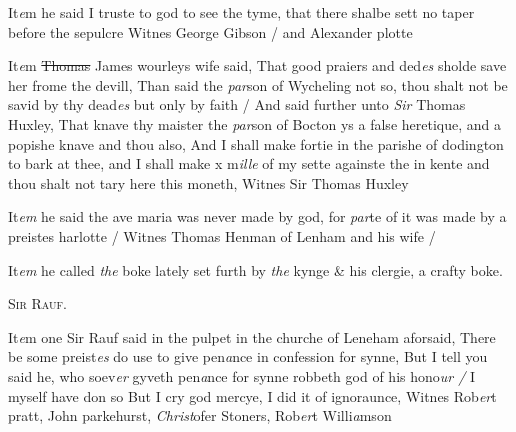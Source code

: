 \documentclass[12pt, a4paper]{book}
\begin{document}
		\ifthenelse{\isodd{\thepage}}
		{\reversemarginpar}
		{\normalmarginpar}
		 It\textit{e}m he said I truste to god to see the tyme, that there shalbe sett no taper
	before the sepulcre Witnes George Gibson / and Alexander plotte

	
	
				\marginpar[\vspace{0.5cm}{\textcolor{Gray}{xxix daye of Maye}}]{}
			
	
				\marginpar[\vspace{0.5cm}{\textcolor{Gray}{seditious}}]{}
			
	
		\ifthenelse{\isodd{\thepage}}
		{\reversemarginpar}
		{\normalmarginpar}
		It\textit{e}m \sout{Thomas} James wourleys wife said, That good praiers and ded\textit{es}
		sholde save her frome the devill, Than said the \textit{par}son of Wycheling
  not so, thou shalt not be savid by thy dead\textit{es} but only by faith /
		And said further unto \textit{Sir} Thomas Huxley, That knave thy maister
 the \textit{par}son of Bocton ys a false heretique, and a popishe knave and
 thou also, And I shall make fortie in the parishe of dodington to bark
 at thee, and I shall make x m\textit{ille} of my sette againste the in kente
 and thou shalt not tary here this moneth, Witnes Sir Thomas
 Huxley

		\ifthenelse{\isodd{\thepage}}
		{\reversemarginpar}
		{\normalmarginpar}
		 It\textit{em} he said the ave maria was never made by god, for \textit{par}te of it was
	made by a preistes harlotte / Witnes Thomas Henman of Lenham
 and his wife /

		\ifthenelse{\isodd{\thepage}}
		{\reversemarginpar}
		{\normalmarginpar}
		 It\textit{em} he called \textit{the} boke lately set furth by \textit{the} kynge \& his clergie,
 a crafty boke.

            
            	
				\begin{center} \begin{large} {\scshape Sir Rauf.} \end{large} \end{center}
			

 	
 		
			
            	
			
 		
		\ifthenelse{\isodd{\thepage}}
		{\reversemarginpar}
		{\normalmarginpar}
		It\textit{e}m one Sir Rauf said in the pulpet in the churche of
 Leneham aforsaid, There be some preist\textit{es} do use to give pen\textit{a}nce in
  confession for synne, But I tell you said he, who soev\textit{er} gyveth
 pen\textit{a}nce for synne robbeth god of his hono\textit{ur /} I myself have don so
 			But I cry god mercye, I did it of ignoraunce, Witnes Rob\textit{er}t
 				pratt, John parkehurst, \textit{Christ}ofer Stoners, Rob\textit{er}t Willi\textit{a}mson
 
\end{document}
